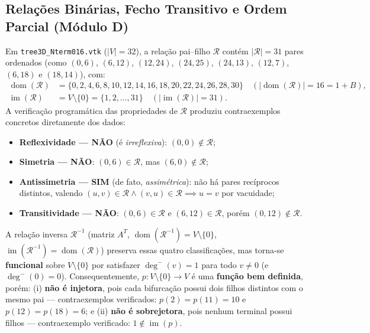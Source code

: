 \documentclass[11pt, a4paper]{article}
\begin{document}
\subsection{Relações Binárias, Fecho Transitivo e Ordem Parcial (Módulo D)}

Em \texttt{tree3D\_Nterm016.vtk} ($|V| = 32$), a relação pai--filho $\mathcal{R}$ contém $|\mathcal{R}| = 31$ pares ordenados (como $(0,6)$, $(6,12)$, $(12,24)$, $(24,25)$, $(24,13)$, $(12,7)$, $(6,18)$ e $(18,14)$), com:
\begin{align*}
  \operatorname{dom}(\mathcal{R}) &= \{0, 2, 4, 6, 8, 10, 12, 14, 16, 18, 20, 22, 24, 26, 28, 30\} \quad (|\operatorname{dom}(\mathcal{R})| = 16 = 1 + B), \\
  \operatorname{im}(\mathcal{R}) &= V \setminus \{0\} = \{1, 2, \dots, 31\} \quad (|\operatorname{im}(\mathcal{R})| = 31).
\end{align*}
A verificação programática das propriedades de $\mathcal{R}$ produziu contraexemplos concretos diretamente dos dados:
\begin{itemize}[leftmargin=*]
  \item \textbf{Reflexividade --- NÃO} (é \emph{irreflexiva}): $(0, 0) \notin \mathcal{R}$;
  \item \textbf{Simetria --- NÃO}: $(0, 6) \in \mathcal{R}$, mas $(6, 0) \notin \mathcal{R}$;
  \item \textbf{Antissimetria --- SIM} (de fato, \emph{assimétrica}): não há pares recíprocos distintos, valendo $(u,v) \in \mathcal{R} \land (v,u) \in \mathcal{R} \implies u = v$ por vacuidade;
  \item \textbf{Transitividade --- NÃO}: $(0, 6) \in \mathcal{R}$ e $(6, 12) \in \mathcal{R}$, porém $(0, 12) \notin \mathcal{R}$.
\end{itemize}

A relação inversa $\mathcal{R}^{-1}$ (matriz $A^T$, $\operatorname{dom}(\mathcal{R}^{-1}) = V \setminus \{0\}$, $\operatorname{im}(\mathcal{R}^{-1}) = \operatorname{dom}(\mathcal{R})$) preserva essas quatro classificações, mas torna-se \textbf{funcional} sobre $V \setminus \{0\}$ por satisfazer $\deg^-(v) = 1$ para todo $v \neq 0$ (e $\deg^-(0) = 0$). Consequentemente, $p : V \setminus \{0\} \to V$ é uma \textbf{função bem definida}, porém: (i) \textbf{não é injetora}, pois cada bifurcação possui dois filhos distintos com o mesmo pai --- contraexemplos verificados: $p(2) = p(11) = 10$ e $p(12) = p(18) = 6$; e (ii) \textbf{não é sobrejetora}, pois nenhum terminal possui filhos --- contraexemplo verificado: $1 \notin \operatorname{im}(p)$.
\end{document}
